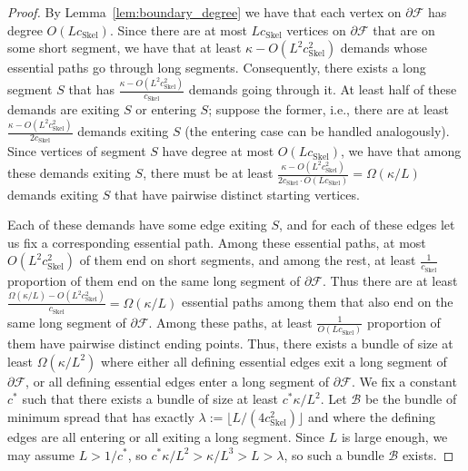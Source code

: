 \documentclass[a4paper,11pt]{article}
\newcommand{\bd}{\partial}
\newcommand{\calB}{\mathcal{B}}
\newcommand{\calF}{\mathcal{F}}
\newcommand{\Skel}{\mathrm{Skel}}
\theoremstyle{plain}
\newtheorem{identification rule}{Identification Rule}
\theoremstyle{definition}
\theoremstyle{remark}
\begin{document}
\begin{proof}
By Lemma~\ref{lem:boundary_degree} we have that each vertex on $\bd\calF$ has degree $O(Lc_\Skel)$. Since there are at most $Lc_\Skel$ vertices on $\bd \calF$ that are on some short segment, we have that at least $\kappa-O(L^2c^2_\Skel)$ demands whose essential paths go through long segments. Consequently, there exists a long segment $S$ that has $\frac{\kappa-O(L^2c^2_\Skel)}{c_\Skel}$ demands going through it. At least half of these demands are exiting $S$ or entering $S$; suppose the former, i.e., there are at least $\frac{\kappa-O(L^2c^2_\Skel)}{2c_\Skel}$ demands exiting $S$ (the entering case can be handled analogously). Since vertices of segment $S$ have degree at most $O(Lc_\Skel)$, we have that among these demands exiting $S$, there must be at least $\frac{\kappa-O(L^2c^2_\Skel)}{2c_\Skel\cdot O(Lc_\Skel)}=\Omega(\kappa/L)$ demands exiting $S$ that have pairwise distinct starting vertices.

Each of these demands have some edge exiting $S$, and for each of these edges let us fix a corresponding essential path. Among these essential paths, at most $O(L^2c^2_\Skel)$ of them end on short segments, and among the rest, at least $\frac{1}{c_\Skel}$ proportion of them end on the same long segment of $\bd\calF$. Thus there are at least 
$\frac{\Omega(\kappa/L)-O(L^2c^2_\Skel)}{c_\Skel}=\Omega(\kappa/L)$
essential paths among them that also end on the same long segment of $\bd \calF$. Among these paths, at least $\frac{1}{O(Lc_\Skel)}$ proportion of them have pairwise distinct ending points. Thus, there exists a bundle of size at least $\Omega(\kappa/L^2)$ where either all defining essential edges exit a long segment of $\bd \calF$, or all defining essential edges enter a long segment of $\bd \calF$. We fix a constant $c^*$ such that there exists a bundle of size at least $c^*\kappa/L^2$. Let $\calB$ be the bundle of minimum spread that has exactly $\lambda:=\lfloor L/(4c^2_\Skel)\rfloor$ and where the defining edges are all entering or all exiting a long segment.  Since $L$ is large enough, we may assume $L>1/c^*$, so $c^*\kappa/L^2>\kappa/L^3>L>\lambda$, so such a bundle $\calB$ exists.


\end{proof}
\end{document}
